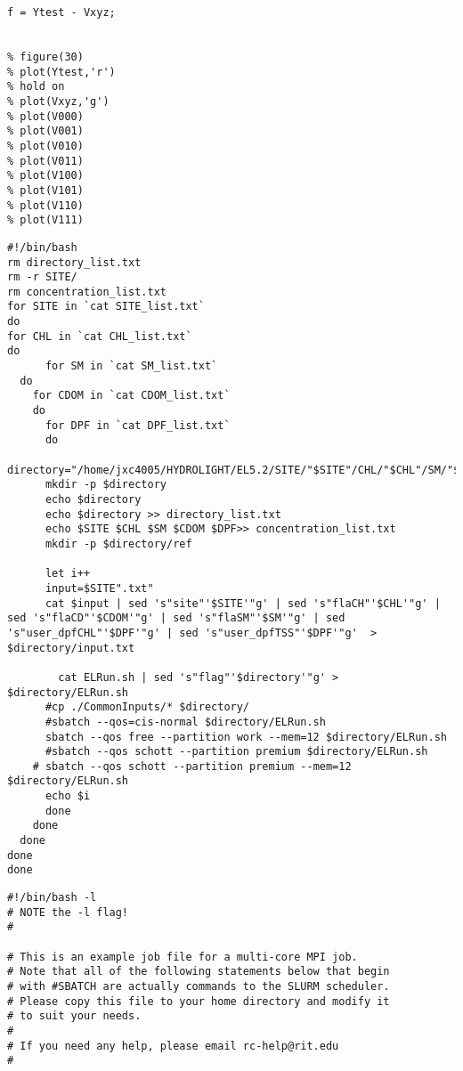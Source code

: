 \begin{appendices}
\begin{lstlisting}
f = Ytest - Vxyz;


% figure(30)
% plot(Ytest,'r')
% hold on
% plot(Vxyz,'g')
% plot(V000)
% plot(V001)
% plot(V010)
% plot(V011)
% plot(V100)
% plot(V101)
% plot(V110)
% plot(V111)

\end{lstlisting}

\singlespacing
{}
\renewcommand{\lstlistingname}{Code}
\begin{lstlisting}
#!/bin/bash
rm directory_list.txt
rm -r SITE/
rm concentration_list.txt
for SITE in `cat SITE_list.txt`
do
for CHL in `cat CHL_list.txt`
do
      for SM in `cat SM_list.txt`
  do
    for CDOM in `cat CDOM_list.txt`
    do
      for DPF in `cat DPF_list.txt`
      do
      directory="/home/jxc4005/HYDROLIGHT/EL5.2/SITE/"$SITE"/CHL/"$CHL"/SM/"$SM"/CDOM/"$CDOM"/DPF/"$DPF 
      mkdir -p $directory
      echo $directory
      echo $directory >> directory_list.txt
      echo $SITE $CHL $SM $CDOM $DPF>> concentration_list.txt 
      mkdir -p $directory/ref 
      
      let i++
      input=$SITE".txt"   
      cat $input | sed 's"site"'$SITE'"g' | sed 's"flaCH"'$CHL'"g' | sed 's"flaCD"'$CDOM'"g' | sed 's"flaSM"'$SM'"g' | sed 's"user_dpfCHL"'$DPF'"g' | sed 's"user_dpfTSS"'$DPF'"g'  > $directory/input.txt

        cat ELRun.sh | sed 's"flag"'$directory'"g' > $directory/ELRun.sh
      #cp ./CommonInputs/* $directory/
      #sbatch --qos=cis-normal $directory/ELRun.sh
      sbatch --qos free --partition work --mem=12 $directory/ELRun.sh
      #sbatch --qos schott --partition premium $directory/ELRun.sh
    # sbatch --qos schott --partition premium --mem=12 $directory/ELRun.sh
      echo $i
      done
    done
  done
done
done 

\end{lstlisting}


\singlespacing
{}
\renewcommand{\lstlistingname}{Code}
\begin{lstlisting}
#!/bin/bash -l
# NOTE the -l flag!
#

# This is an example job file for a multi-core MPI job.
# Note that all of the following statements below that begin
# with #SBATCH are actually commands to the SLURM scheduler.
# Please copy this file to your home directory and modify it
# to suit your needs.
# 
# If you need any help, please email rc-help@rit.edu
#


\end{lstlisting}
\end{appendices}
